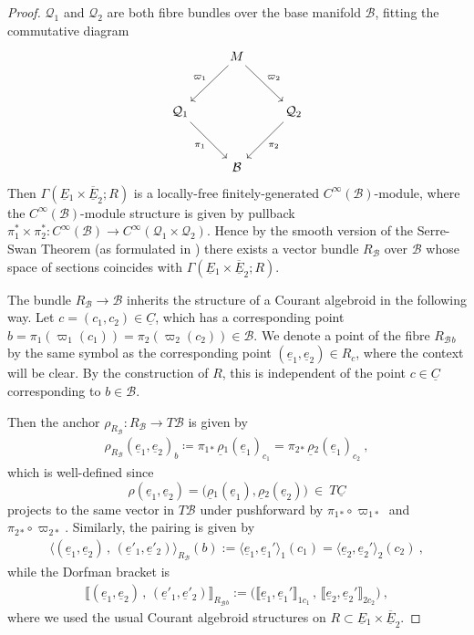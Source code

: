 \documentclass[a4paper, reqno, 11pt]{amsart}
\numberwithin{equation}{section}
\theoremstyle{definition}
\newcommand{\cbrak}[1]{\llbracket #1 \rrbracket}
\newcommand{\red}[1]{\underline{#1}}
\newcommand{\cB}{{\mathcal B}}
\newcommand{\cQ}{{\mathcal Q}}
\newcommand{\sfGamma}{{\mathsf{\Gamma}}}
\theoremstyle{remark}
\begin{document}
\begin{proof}
    $\cQ_1$ and $\cQ_2$ are both fibre bundles over the base manifold $\cB$, fitting the commutative diagram
    \begin{equation} \label{cd:correspondencespace}
        \begin{tikzcd}[row sep = 1cm]
             & M \arrow[swap]{dl}{\varpi_1} \arrow{dr}{\varpi_2} & \\
            \cQ_1 \arrow[swap]{dr}{\pi_1} &  & \cQ_2 \arrow{dl}{\pi_2} \\
             & \cB & 
        \end{tikzcd}
    \end{equation} 
    Then $\sfGamma(\red E{}_1 \times \overline{\red E}_2; R)$ is a locally-free finitely-generated $C^\infty(\cB)$-module, where the $C^\infty(\cB)$-module structure is given by pullback $\pi_1^*\times\pi_2^*:C^\infty(\cB)\to C^\infty(\cQ_1\times\cQ_2)$. Hence by the smooth version of the Serre-Swan Theorem (as formulated in \cite[Chapter 11]{Nestruev2020}) there exists a vector bundle $R_\cB$ over $\cB$ whose space of sections coincides with $\sfGamma(\red E{}_1 \times \overline{\red E}_2; R)$. 
    
    The bundle $R_\cB\to\cB$ inherits the structure of a Courant algebroid in the following way. Let $c = (c_1,c_2)\in \red C$, which has a corresponding point $b=\pi_1(\varpi_1(c_1))=\pi_2(\varpi_2(c_2))\in \cB$. We denote a point of the fibre $R_\cB{}_b$ by the same symbol as the corresponding point $(\red e_1,\red e_2) \in R_c$, where the context will be clear. By the construction of $R$, this is independent of the point $c \in \red C$ corresponding to $b\in\cB$. 
    
    Then the anchor $\rho_{R_\cB}:R_\cB\to T\cB$ is given by
    \begin{align}
        \rho_{R_\cB}(\red e_1,\red e_2)_b \coloneqq \pi_1{}_* \,\red \rho{}_1(\red e_1)_{c_1}=\pi_2{}_*\,\red \rho{}_2(\red e_1)_{c_2} \ ,
    \end{align}
    which is well-defined since $$\rho(\red e_1,\red e_2) = \big(\red\rho{}_1(\red e_1),\red\rho{}_2(\red e_2)\big) \ \in \ T\red C $$  projects to the same vector in $T\cB$ under pushforward by $\pi_1{}_* \circ \varpi_{1*}$ and $\pi_2{}_* \circ \varpi_{2*}$. Similarly, the pairing is given by
    \begin{align}
        \big\langle (\red e_1,\red e_2) \,,\, (\red e'_1,\red e'_2)\big\rangle_{R_\cB}(b) := \langle\red e_1,\red e_1'\rangle_1(c_1) =  \langle\red e_2 , \red e_2'\rangle_2(c_2) \ ,
    \end{align}
    while the Dorfman bracket is
    \begin{align}
    \cbrak{(\red e_1,\red e_2)\,,\,(\red e'_1,\red e'_2)}_{R_\cB{}_b} := \big( \cbrak{\red e_1,\red e_1'}_{1 c_1} \,,\, \cbrak{\red e_2,\red e_2'}_{2 c_2}\big) \ ,
    \end{align}
    where we used the usual Courant algebroid structures on $R\subset \red E{}_1\times\overline{\red E}_2$.
\end{proof}
\end{document}
